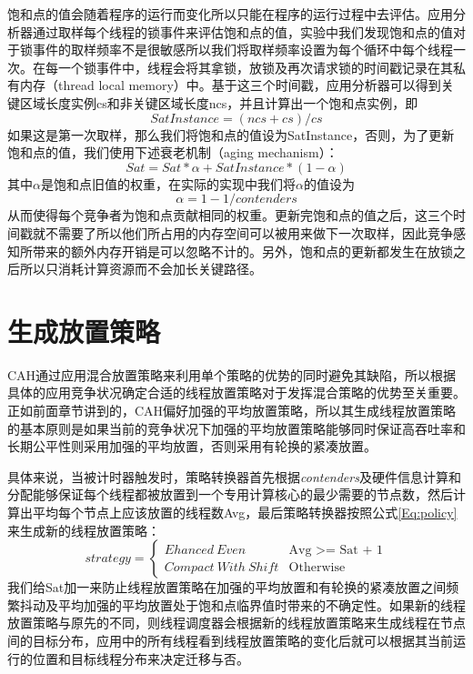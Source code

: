 饱和点的值会随着程序的运行而变化所以只能在程序的运行过程中去评估。应用分析器通过取样每个线程的锁事件来评估饱和点的值，实验中我们发现饱和点的值对于锁事件的取样频率不是很敏感所以我们将取样频率设置为每个循环中每个线程一次。在每一个锁事件中，线程会将其拿锁，放锁及再次请求锁的时间戳记录在其私有内存（thread local memory）中。基于这三个时间戳，应用分析器可以得到关键区域长度实例cs和非关键区域长度ncs，并且计算出一个饱和点实例，即
\begin{equation}\label{Eq:saturationInstance}
     SatInstance = (ncs + cs) / cs
\end{equation}
如果这是第一次取样，那么我们将饱和点的值设为SatInstance，否则，为了更新饱和点的值，我们使用下述衰老机制（aging mechanism）：
\begin{equation}
     Sat = Sat * \alpha + SatInstance * (1 - \alpha)
\end{equation}
其中$\alpha$是饱和点旧值的权重，在实际的实现中我们将$\alpha$的值设为
\begin{equation}
     \alpha = 1 - 1/contenders
\end{equation} 
从而使得每个竞争者为饱和点贡献相同的权重。更新完饱和点的值之后，这三个时间戳就不需要了所以他们所占用的内存空间可以被用来做下一次取样，因此竞争感知所带来的额外内存开销是可以忽略不计的。另外，饱和点的更新都发生在放锁之后所以只消耗计算资源而不会加长关键路径。

\section{生成放置策略}
CAH通过应用混合放置策略来利用单个策略的优势的同时避免其缺陷，所以根据具体的应用竞争状况确定合适的线程放置策略对于发挥混合策略的优势至关重要。正如前面章节讲到的，CAH偏好加强的平均放置策略，所以其生成线程放置策略的基本原则是如果当前的竞争状况下加强的平均放置策略能够同时保证高吞吐率和长期公平性则采用加强的平均放置，否则采用有轮换的紧凑放置。

具体来说，当被计时器触发时，策略转换器首先根据\emph{contenders}及硬件信息计算和分配能够保证每个线程都被放置到一个专用计算核心的最少需要的节点数，然后计算出平均每个节点上应该放置的线程数Avg，最后策略转换器按照公式\ref{Eq:policy}来生成新的线程放置策略：
\begin{equation}\label{Eq:policy}
strategy=
\begin{cases}
Ehanced\ Even &\text{Avg >=  Sat  + 1}\\
Compact\  With\  Shift &\text{Otherwise}
\end{cases}
\end{equation}
我们给Sat加一来防止线程放置策略在加强的平均放置和有轮换的紧凑放置之间频繁抖动及平均加强的平均放置处于饱和点临界值时带来的不确定性。如果新的线程放置策略与原先的不同，则线程调度器会根据新的线程放置策略来生成线程在节点间的目标分布，应用中的所有线程看到线程放置策略的变化后就可以根据其当前运行的位置和目标线程分布来决定迁移与否。

